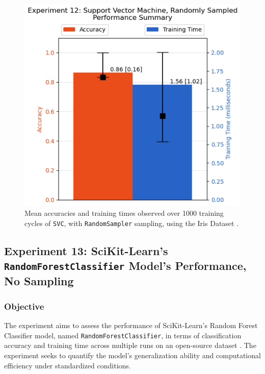 \documentclass{article}
\theoremstyle{plain}
\theoremstyle{definition}
\theoremstyle{remark}
\begin{document}
\begin{figure}[ht]
	\vskip 0.2in
	\begin{center}
		\centerline{\includegraphics[width=\columnwidth]{experiment_12}}
		\caption{Mean accuracies and training times observed over 1000 training cycles of \texttt{SVC}, with \texttt{RandomSampler} sampling, using the Iris Dataset \cite{iris}.}
		\label{experiment_12}
	\end{center}
	\vskip -0.2in
\end{figure}


\subsection{Experiment 13: SciKit-Learn's \texttt{RandomForestClassifier} Model's Performance, No Sampling}

\subsubsection{Objective}

The experiment aims to assess the performance of SciKit-Learn's Random Forest Classifier model, named \texttt{RandomForestClassifier}, in terms of classification accuracy and training time across multiple runs on an open-source dataset \cite{wine}. The experiment seeks to quantify the model's generalization ability and computational efficiency under standardized conditions.
\end{document}
